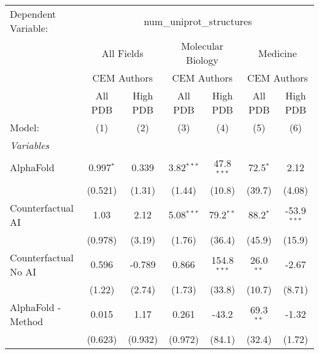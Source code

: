 \begingroup
\centering
\begin{tabular}{lcccccc}
   \tabularnewline \midrule \midrule
   Dependent Variable: & \multicolumn{6}{c}{num\_uniprot\_structures}\\
 & \multicolumn{2}{c}{All Fields} & \multicolumn{2}{c}{Molecular Biology} & \multicolumn{2}{c}{Medicine} \\
\cmidrule(lr){2-3} \cmidrule(lr){4-5} \cmidrule(lr){6-7}
 & \multicolumn{2}{c}{CEM Authors} & \multicolumn{2}{c}{CEM Authors} & \multicolumn{2}{c}{CEM Authors} \\
\cmidrule(lr){2-3} \cmidrule(lr){4-5} \cmidrule(lr){6-7}
 & \multicolumn{1}{c}{All PDB} & \multicolumn{1}{c}{High PDB} & \multicolumn{1}{c}{All PDB} & \multicolumn{1}{c}{High PDB} & \multicolumn{1}{c}{All PDB} & \multicolumn{1}{c}{High PDB} \\
\cmidrule(lr){2-2} \cmidrule(lr){3-3} \cmidrule(lr){4-4} \cmidrule(lr){5-5} \cmidrule(lr){6-6} \cmidrule(lr){7-7}
   Model:                                                     & (1)          & (2)     & (3)          & (4)           & (5)          & (6)\\  
   \midrule
   \emph{Variables}\\
   AlphaFold                                                  & 0.997$^{*}$  & 0.339   & 3.82$^{***}$ & 47.8$^{***}$  & 72.5$^{*}$   & 2.12\\   
                                                              & (0.521)      & (1.31)  & (1.44)       & (10.8)        & (39.7)       & (4.08)\\   
   Counterfactual AI                                          & 1.03         & 2.12    & 5.08$^{***}$ & 79.2$^{**}$   & 88.2$^{*}$   & -53.9$^{***}$\\   
                                                              & (0.978)      & (3.19)  & (1.76)       & (36.4)        & (45.9)       & (15.9)\\   
   Counterfactual No AI                                       & 0.596        & -0.789  & 0.866        & 154.8$^{***}$ & 26.0$^{**}$  & -2.67\\   
                                                              & (1.22)       & (2.74)  & (1.73)       & (33.8)        & (10.7)       & (8.71)\\   
   AlphaFold - Method                                         & 0.015        & 1.17    & 0.261        & -43.2         & 69.3$^{**}$  & -1.32\\   
                                                              & (0.623)      & (0.932) & (0.972)      & (84.1)        & (32.4)       & (1.72)\\   

\end{tabular}
